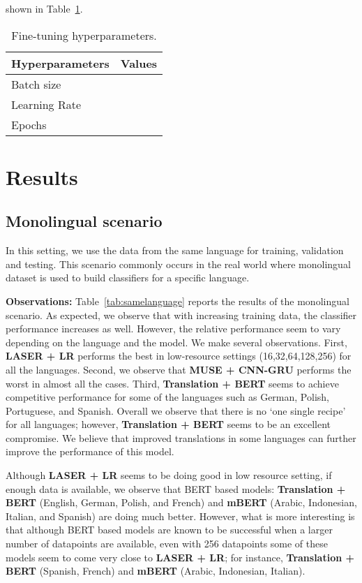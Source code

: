 \documentclass[runningheads]{llncs}
\begin{document}
shown in Table~\ref{Tab:fine_tune_parameter}.

\begin{table}[htb]
\scriptsize
\centering
\caption{Fine-tuning hyperparameters.}
\label{Tab:fine_tune_parameter}
\begin{tabular}{ll}
\toprule
Hyperparameters & Values           \\
\midrule
Batch size    &                \\
Learning Rate &  \\
Epochs        &        \\
\bottomrule
\end{tabular}
\end{table}
\fi 



\section{Results}\label{sec:results}



\subsection{Monolingual scenario}
In this setting, we use the data from the same language for training, validation and testing. This scenario commonly occurs in the real world where monolingual dataset is used to build classifiers for a specific language.

\noindent\textbf{Observations:} Table~\ref{tab:samelanguage} reports the results of the monolingual scenario. As expected, we observe that with increasing training data, the classifier performance increases as well. However, the relative performance seem to vary depending on the language and the model. We make several observations. First, \textbf{LASER + LR} performs the best in low-resource settings (16,32,64,128,256) for all the languages. Second, we observe that \textbf{MUSE + CNN-GRU} performs the worst in almost all the cases. Third, \textbf{Translation + BERT} seems to achieve competitive performance for some of the languages such as German, Polish, Portuguese, and Spanish.
Overall we observe that there is no `one single recipe' for all languages; however, \textbf{Translation + BERT} seems to be an excellent compromise. We believe that improved translations in some languages can further improve the performance of this model. 

Although \textbf{LASER + LR} seems to be doing good in low resource setting, if enough data is available, we observe that BERT based models: \textbf{Translation + BERT} (English, German, Polish, and French) and  \textbf{mBERT} (Arabic, Indonesian, Italian, and Spanish) are doing much better. However, what is more interesting is that although BERT based models are known to be successful when a larger number of datapoints are available, even with 256 datapoints some of these models seem to come very close to \textbf{LASER + LR}; for instance, \textbf{Translation + BERT} (Spanish, French) and \textbf{mBERT} (Arabic, Indonesian, Italian).
\end{document}
